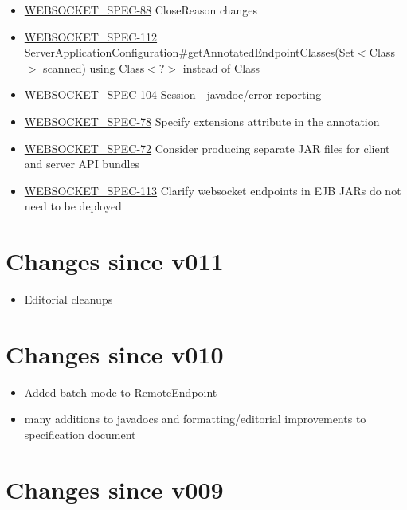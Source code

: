 \begin{itemize}
\item \href {http://java.net/jira/browse/WEBSOCKET_SPEC-88}{WEBSOCKET\_SPEC-88} CloseReason changes
\item \href {http://java.net/jira/browse/WEBSOCKET_SPEC-112}{WEBSOCKET\_SPEC-112} ServerApplicationConfiguration\#getAnnotatedEndpointClasses(Set$<$Class$>$ scanned) using Class$<$?$>$ instead of Class
\item \href {http://java.net/jira/browse/WEBSOCKET_SPEC-104}{WEBSOCKET\_SPEC-104} Session - javadoc/error reporting
\item \href {http://java.net/jira/browse/WEBSOCKET_SPEC-78}{WEBSOCKET\_SPEC-78} Specify extensions attribute in the annotation
\item \href {http://java.net/jira/browse/WEBSOCKET_SPEC-72}{WEBSOCKET\_SPEC-72} Consider producing separate JAR files for client and server API bundles
\item \href {http://java.net/jira/browse/WEBSOCKET_SPEC-113}{WEBSOCKET\_SPEC-113} Clarify websocket endpoints in EJB JARs do not need to be deployed
\end{itemize}

\section*{Changes since v011}

\begin{itemize}
\item Editorial cleanups
\end{itemize}

\section*{Changes since v010}

\begin{itemize}
\item Added batch mode to RemoteEndpoint
\item many additions to javadocs and formatting/editorial improvements to specification document
\end{itemize}

\section*{Changes since v009}

